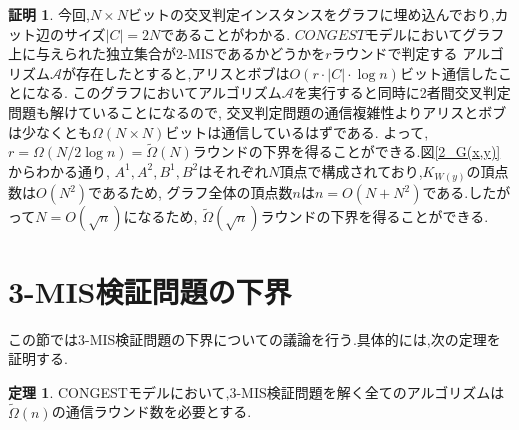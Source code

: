 \documentclass[12pt]{thesis}
\newcommand{\CONGEST}{\textsf{CONGEST}}
\theoremstyle{definition}
\newtheorem{theorem}{定理}[chapter]
\newtheorem*{prf*}{証明}
\begin{document}
\begin{prf*}
今回,$N \times N$ビットの交叉判定インスタンスをグラフに埋め込んでおり,カット辺のサイズ$|C| = 2N$であることがわかる.
$CONGEST$モデルにおいてグラフ上に与えられた独立集合が2-MISであるかどうかを$r$ラウンドで判定する
アルゴリズム$\mathcal{A}$が存在したとすると,アリスとボブは$O(r \cdot |C| \cdot \log n)$ビット通信したことになる.
このグラフにおいてアルゴリズム$\mathcal{A}$を実行すると同時に2者間交叉判定問題も解けていることになるので,
交叉判定問題の通信複雑性よりアリスとボブは少なくとも$\Omega (N \times N)$ビットは通信しているはずである.
よって,$r = \Omega (N / 2\log n) = \tilde{\Omega}(N)$ラウンドの下界を得ることができる.図\ref{2_G(x,y)}からわかる通り,
$A^{1}, A^{2}, B^{1}, B^{2}$はそれぞれ$N$頂点で構成されており,$K_{W(y)}$の頂点数は$O(N^{2})$であるため,
グラフ全体の頂点数$n$は$n = O(N + N^{2})$である.したがって$N = O(\sqrt{n})$になるため,
$\tilde{\Omega}(\sqrt{n})$ラウンドの下界を得ることができる. 
\end{prf*}
\newpage

\section{3-MIS検証問題の下界}
この節では3-MIS検証問題の下界についての議論を行う.具体的には,次の定理を証明する.
\begin{theorem}
{\CONGEST}モデルにおいて,3-MIS検証問題を解く全てのアルゴリズムは$\tilde{\Omega} (n)$の通信ラウンド数を必要とする.
\end{theorem}
\end{document}
